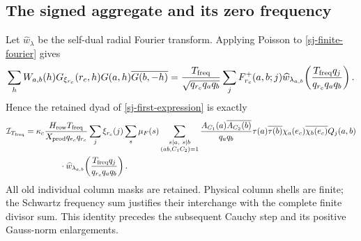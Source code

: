 \documentclass[11pt]{article}
\theoremstyle{definition}
\begin{document}
\subsection{The signed aggregate and its zero frequency}
Let $\widehat w_\lambda$ be the self-dual radial Fourier transform.
Applying Poisson to \eqref{sj-finite-fourier} gives
\[
 \sum_h W_{a,b}(h)G_{\xi_{r_c}}(r_c,h)G(a,h)\overline{G(b,-h)}
 =\frac{T_{\rm freq}}{\sqrt{q_{r_c}q_aq_b}}
 \sum_jF^+_{r_c}(a,b;j)
 \widehat w_{\lambda_{a,b}}\!\left(
             \frac{T_{\rm freq}q_j}{q_{r_c}q_aq_b}\right).
\]
Hence the retained dyad of \eqref{sj-first-expression} is exactly
\begin{align}\label{sj-signed-aggregate}
 \mathcal I_{T_{\rm freq}}={}&\kappa_c\frac{H_{\rm row}T_{\rm freq}}
                                    {X_{\rm prod}q_{e_c}q_{r_c}}
 \sum_j\xi_{r_c}(j)\sum_s\mu_F(s)
 \sum_{\substack{s\mid a,\ s\mid b\\(ab,C_1C_2)=1}}
 \frac{A_{C_1}(a)\overline{A_{C_2}(b)}}{q_aq_b}
 \tau(a)\overline{\tau(b)}\chi_a(e_c)\overline{\chi_b(e_c)}
 Q_j(a,b)\notag\\
 &\hspace{10mm}\cdot\widehat w_{\lambda_{a,b}}\!\left(
                  \frac{T_{\rm freq}q_j}{q_{r_c}q_aq_b}\right).
\end{align}
All old individual column masks are retained.  Physical column shells are
finite; the Schwartz frequency sum justifies their interchange with the
complete finite divisor sum.  This identity precedes the subsequent Cauchy step and its positive
Gauss-norm enlargements.
\end{document}
